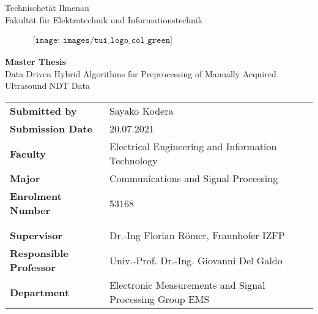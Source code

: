 \thispagestyle{empty}
\begin{center}
\large{Technischetät Ilmenau}\\
\large{Fakultät für Elektrotechnik und Informationstechnik}
\end{center}

\vspace{0.15cm}


\begin{figure}[htbp]
\begin{center}$
\begin{array}{cc}
\texttt{[image: images/tui\_logo\_col\_green]}
\end{array}$
\end{center}
\end{figure}

\vspace{0.6cm}

\begin{center}
\textbf{\Huge{Master Thesis}}\\ \vspace{0.25cm}
\LARGE Data Driven Hybrid Algorithms for Preprocessing of Manually Acquired Ultrasound NDT Data
\end{center}
\vspace{1cm}

%

\begin{flushleft}
\normalsize
\renewcommand{\arraystretch}{1.5} 
\begin{tabular}{lll}
\textbf{Submitted by}  & Sayako Kodera\\
\textbf{Submission Date}  & 20.07.2021 \\
\textbf{Faculty} &  Electrical Engineering and Information Technology\\
\textbf{Major}  & Communications and Signal Processing\\
\textbf{Enrolment Number}  & 53168\\
&  \\\\
\textbf{Supervisor} &  Dr.-Ing Florian R{ö}mer, Fraunhofer IZFP\\
\textbf{Responsible Professor} &  Univ.-Prof. Dr.-Ing. Giovanni Del Galdo\\
\textbf{Department} &  Electronic Measurements and Signal Processing Group EMS

\end{tabular}
\end{flushleft}


\newpage


